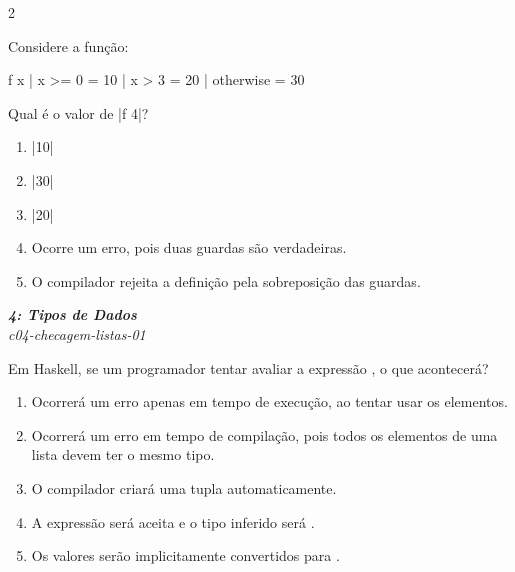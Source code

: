 \documentclass[a4paper,10pt,brazil]{article}
\begin{document}
\begin{multicols}{2}
\begin{flushright}
\end{flushright}
Considere a função:
\begin{haskellcode}
f x
  | x >= 0    = 10
  | x > 3     = 20
  | otherwise = 30
\end{haskellcode}
Qual é o valor de \haskellinline|f 4|?

\begin{enumerate}
  \item \haskellinline|10|

  \item \haskellinline|30|

  \item \haskellinline|20|

  \item Ocorre um erro, pois duas guardas são verdadeiras.

  \item O compilador rejeita a definição pela sobreposição das guardas.


\end{enumerate}

\begin{flushright}
  \footnotesize
  \textit{\textbf{4: Tipos de Dados}}\\
  \textit{c04-checagem-listas-01}\\

\end{flushright}
Em Haskell, se um programador tentar avaliar a expressão , o que acontecerá?

\begin{enumerate}
  \item Ocorrerá um erro apenas em tempo de execução, ao tentar usar os elementos.

  \item Ocorrerá um erro em tempo de compilação, pois todos os elementos de uma lista devem ter o mesmo tipo.

  \item O compilador criará uma tupla automaticamente.

  \item A expressão será aceita e o tipo inferido será .

  \item Os valores serão implicitamente convertidos para .


\end{enumerate}


\end{multicols}
\end{document}
